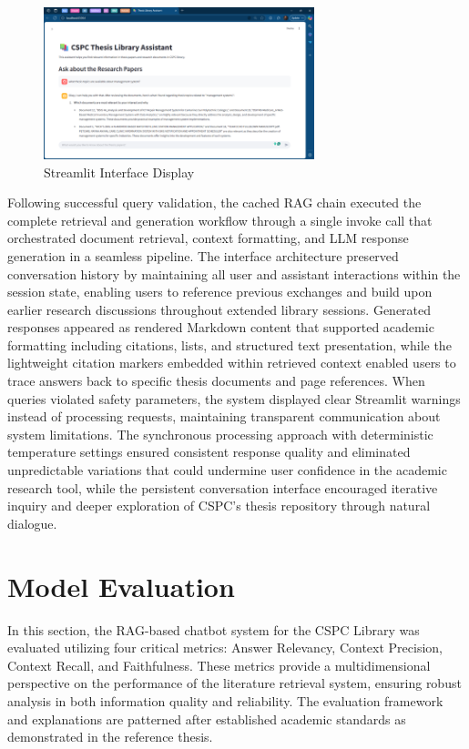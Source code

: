 \begin{refsection}
\begin{figure}[h]
    \centering
    \includegraphics[width=0.7\textwidth]{figures/streamlit.png}
    \caption{Streamlit Interface Display}
\end{figure}

Following successful query validation, the cached RAG chain executed the complete retrieval and generation workflow through a single invoke call that orchestrated document retrieval, context formatting, and LLM response generation in a seamless pipeline. The interface architecture preserved conversation history by maintaining all user and assistant interactions within the session state, enabling users to reference previous exchanges and build upon earlier research discussions throughout extended library sessions. Generated responses appeared as rendered Markdown content that supported academic formatting including citations, lists, and structured text presentation, while the lightweight citation markers embedded within retrieved context enabled users to trace answers back to specific thesis documents and page references. When queries violated safety parameters, the system displayed clear Streamlit warnings instead of processing requests, maintaining transparent communication about system limitations. The synchronous processing approach with deterministic temperature settings ensured consistent response quality and eliminated unpredictable variations that could undermine user confidence in the academic research tool, while the persistent conversation interface encouraged iterative inquiry and deeper exploration of CSPC's thesis repository through natural dialogue.

\section{Model Evaluation}
In this section, the RAG-based chatbot system for the CSPC Library was evaluated utilizing four critical metrics: Answer Relevancy, Context Precision, Context Recall, and Faithfulness. These metrics provide a multidimensional perspective on the performance of the literature retrieval system, ensuring robust analysis in both information quality and reliability. The evaluation framework and explanations are patterned after established academic standards as demonstrated in the reference thesis.


\end{refsection}
